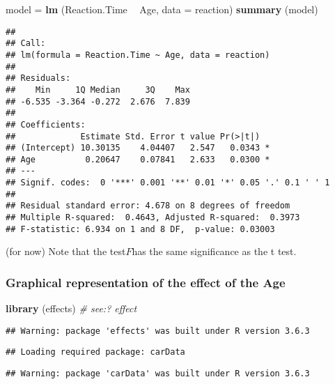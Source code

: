 \documentclass[
]{article}
\newenvironment{Shaded}{\begin{snugshade}}{\end{snugshade}}
\newcommand{\CommentTok}[1]{\textcolor[rgb]{0.56,0.35,0.01}{\textit{#1}}}
\newcommand{\DataTypeTok}[1]{\textcolor[rgb]{0.13,0.29,0.53}{#1}}
\newcommand{\KeywordTok}[1]{\textcolor[rgb]{0.13,0.29,0.53}{\textbf{#1}}}
\newcommand{\NormalTok}[1]{#1}
\newcommand{\OperatorTok}[1]{\textcolor[rgb]{0.81,0.36,0.00}{\textbf{#1}}}
\newcommand{\StringTok}[1]{\textcolor[rgb]{0.31,0.60,0.02}{#1}}
\begin{document}
\begin{Shaded}
\begin{Highlighting}[]
\NormalTok{model =}\StringTok{ }\KeywordTok{lm}\NormalTok{ (Reaction.Time }\OperatorTok{~}\StringTok{ }\NormalTok{Age, }\DataTypeTok{data =}\NormalTok{ reaction)}
\KeywordTok{summary}\NormalTok{ (model)}
\end{Highlighting}
\end{Shaded}

\begin{verbatim}
## 
## Call:
## lm(formula = Reaction.Time ~ Age, data = reaction)
## 
## Residuals:
##    Min     1Q Median     3Q    Max 
## -6.535 -3.364 -0.272  2.676  7.839 
## 
## Coefficients:
##             Estimate Std. Error t value Pr(>|t|)  
## (Intercept) 10.30135    4.04407   2.547   0.0343 *
## Age          0.20647    0.07841   2.633   0.0300 *
## ---
## Signif. codes:  0 '***' 0.001 '**' 0.01 '*' 0.05 '.' 0.1 ' ' 1
## 
## Residual standard error: 4.678 on 8 degrees of freedom
## Multiple R-squared:  0.4643, Adjusted R-squared:  0.3973 
## F-statistic: 6.934 on 1 and 8 DF,  p-value: 0.03003
\end{verbatim}

(for now) Note that the test\(F\)has the same significance as the t
test.

\hypertarget{graphical-representation-of-the-effect-of-the-age}{%
\subsubsection{Graphical representation of the effect of the
Age}\label{graphical-representation-of-the-effect-of-the-age}}

\begin{Shaded}
\begin{Highlighting}[]
\KeywordTok{library}\NormalTok{ (effects) }\CommentTok{# see:? effect}
\end{Highlighting}
\end{Shaded}

\begin{verbatim}
## Warning: package 'effects' was built under R version 3.6.3
\end{verbatim}

\begin{verbatim}
## Loading required package: carData
\end{verbatim}

\begin{verbatim}
## Warning: package 'carData' was built under R version 3.6.3
\end{verbatim}
\end{document}
